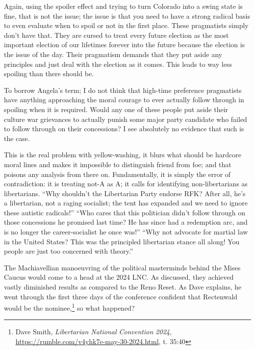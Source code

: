 \documentclass[11pt]{article}
\begin{document}
Again, using the spoiler effect and trying to turn Colorado into a swing state is fine, that is not the issue; the issue is that you need to have a strong radical basis to even evaluate when to spoil or not in the first place. These pragmatists simply don't have that. They are cursed to treat every future election as the most important election of our lifetimes forever into the future because the election is the issue of the day. Their pragmatism demands that they put aside any principles and just deal with the election as it comes. This leads to way less spoiling than there should be.

To borrow Angela's term; I do not think that high-time preference pragmatists have anything approaching the moral courage to ever actually follow through in spoiling when it is required. Would any one of these people put aside their culture war grievances to actually punish some major party candidate who failed to follow through on their concessions? I see absolutely no evidence that such is the case.

This is the real problem with yellow-washing, it blurs what should be hardcore moral lines and makes it impossible to distinguish friend from foe; and that poisons any analysis from there on. Fundamentally, it is simply the error of contradiction: it is treating not-A as A; it calls for identifying non-libertarians as libertarians. ``Why shouldn't the Libertarian Party endorse RFK? After all, he's a libertarian, not a raging socialist; the tent has expanded and we need to ignore these autistic radicals!'' ``Who cares that this politician didn't follow through on those concessions he promised last time? He has since had a redemption arc, and is no longer the career-socialist he once was!'' ``Why not advocate for martial law in the United States? This was the principled libertarian stance all along! You people are just too concerned with theory.''

The Machiavellian manoeuvring of the political masterminds behind the Mises Caucus would come to a head at the 2024 LNC. As discussed, they achieved vastly diminished results as compared to the Reno Reset. As Dave explains, he went through the first three days of the conference confident that Rectenwald would be the nominee,\footnote{Dave Smith, \emph{Libertarian National Convention 2024}, \url{https://rumble.com/v4yhk7e-may-30-2024.html}, t. 35:40} so what happened?
\end{document}
